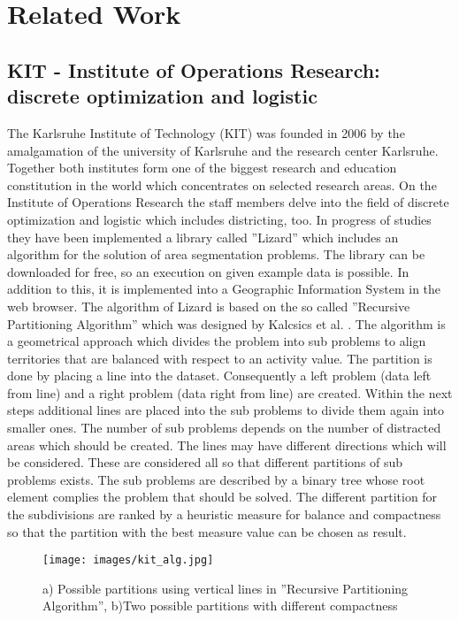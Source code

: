 \section{Related Work}

\subsection{KIT - Institute of Operations Research: discrete optimization and logistic}\label{KIT}

The Karlsruhe Institute of Technology (KIT) was founded in 2006 by the amalgamation of the university of Karlsruhe and the research center Karlsruhe. Together both institutes form one of the biggest research and education constitution in the world which concentrates on selected research areas. On the Institute of Operations Research the staff members delve into the field of discrete optimization and logistic which includes districting, too. In progress of studies they have been implemented a library called ''Lizard'' which includes an algorithm for the solution of area segmentation problems. The library can be downloaded for free, so an execution on given example data is possible. In addition to this, it is implemented into a Geographic Information System in the web browser. The algorithm of Lizard is based on the so called ''Recursive Partitioning Algorithm'' which was designed by Kalcsics et al. \cite{kalcsics}. The algorithm is a geometrical approach which divides the problem into sub problems to align territories that are balanced with respect to an activity value. The partition is done by placing a line into the dataset. Consequently a left problem (data left from line) and a right problem (data right from line) are created. Within the next steps additional lines are placed into the sub problems to divide them again into smaller ones. The number of sub problems depends on the number of distracted areas which should be created. The lines may have different directions which will be considered. These are considered all so that different partitions of sub problems exists. The sub problems are described by a binary tree whose root element complies the problem that should be solved. The different partition for the subdivisions are ranked by a heuristic measure for balance and compactness so that the partition with the best measure value can be chosen as result.


\begin{figure}[H]
	\centering
	\texttt{[image: images/kit\_alg.jpg]}
	\caption[Possible partitions within ''Recursive Partitioning Algorithm''.]{a) Possible partitions using vertical lines in ''Recursive Partitioning Algorithm'', b)Two possible partitions with different compactness \cite{kalcsics}}
\end{figure}

